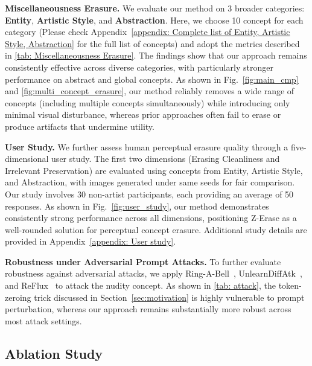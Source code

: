 \textbf{Miscellaneousness Erasure.}
We evaluate our method on 3 broader categories: \textbf{Entity}, \textbf{Artistic Style}, and \textbf{Abstraction}. Here, we choose 10 concept for
each category (Please check Appendix~\ref{appendix: Complete list of Entity, Artistic Style, Abstraction} for the full list of concepts) and adopt the metrics described in \cref{tab: Miscellaneousness Erasure}. 
The findings show that our approach remains consistently effective across diverse categories, with particularly stronger performance on abstract and global concepts. As shown in Fig.~\ref{fig:main_cmp} and \ref{fig:multi_concept_erasure}, our method reliably removes a wide range of concepts (including multiple concepts simultaneously) while introducing only minimal visual disturbance, whereas prior approaches often fail to erase or produce artifacts that undermine utility.


\textbf{User Study.}
We further assess human perceptual erasure quality through a five-dimensional user study. The first two dimensions (Erasing Cleanliness and Irrelevant Preservation) are evaluated using concepts from Entity, Artistic Style, and Abstraction, with images generated under same seeds for fair comparison. Our study involves 30 non-artist participants, each providing an average of 50 responses. As shown in Fig.~\ref{fig:user_study}, our method demonstrates consistently strong performance across all dimensions, positioning Z-Erase as a well-rounded solution for perceptual concept erasure. Additional study details are provided in Appendix~\ref{appendix: User study}.



\textbf{Robustness under Adversarial Prompt Attacks.}
To further evaluate robustness against adversarial attacks, we apply Ring-A-Bell~\cite{ringabell}, UnlearnDiffAtk~\cite{unlearndiffatk}, and ReFlux~\cite{reflux} to attack the nudity concept. As shown in \cref{tab: attack}, the token-zeroing trick discussed in Section~\ref{sec:motivation} is highly vulnerable to prompt perturbation, whereas our approach remains substantially more robust across most attack settings.



\subsection{Ablation Study}


